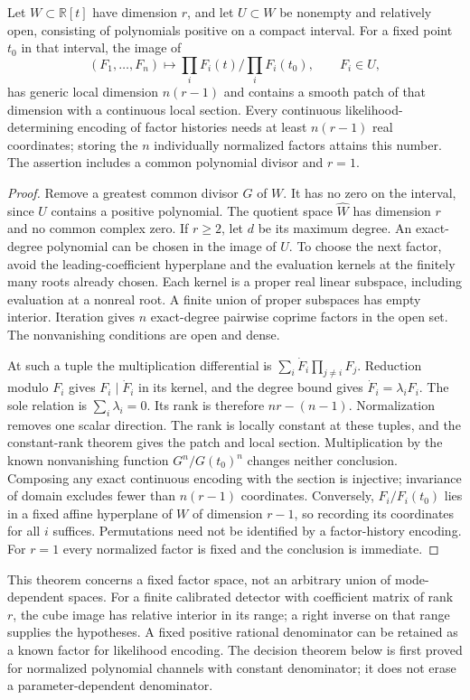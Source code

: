 \begin{theorem}\label{thm:rank-deficient}
Let $W\subset\mathbb R[t]$ have dimension $r$, and let $U\subset W$ be
nonempty and relatively open, consisting of polynomials positive on a
compact interval. For a fixed point $t_0$ in that interval, the image of
\[
 (F_1,\ldots,F_n)\longmapsto
 \prod_iF_i(t)/\prod_iF_i(t_0),\qquad F_i\in U,
\]
has generic local dimension $n(r-1)$ and contains a smooth patch of that
dimension with a continuous local section. Every continuous likelihood-determining
encoding of factor histories needs at least $n(r-1)$ real coordinates; storing
the $n$ individually normalized factors attains this number. The assertion
includes a common polynomial divisor and $r=1$.
\end{theorem}
\begin{proof}
Remove a greatest common divisor $G$ of $W$. It has no zero on the interval,
since $U$ contains a positive polynomial. The quotient space $\widehat W$
has dimension $r$ and no common complex zero. If $r\ge2$, let $d$ be its
maximum degree. An exact-degree polynomial can be chosen in the image of
$U$. To choose the next factor, avoid the leading-coefficient hyperplane
and the evaluation kernels at the finitely many roots already chosen.
Each kernel is a proper real linear subspace, including evaluation at a
nonreal root. A finite union of proper subspaces has empty interior.
Iteration gives $n$ exact-degree pairwise coprime factors in the open set.
The nonvanishing conditions are open and dense.

At such a tuple the multiplication differential is
$\sum_i\dot F_i\prod_{j\ne i}F_j$. Reduction modulo $F_i$ gives
$F_i\mid\dot F_i$ in its kernel, and the degree bound gives
$\dot F_i=\lambda_i F_i$. The sole relation is $\sum_i\lambda_i=0$.
Its rank is therefore $nr-(n-1)$. Normalization removes one scalar
direction. The rank is locally constant at these tuples, and the
constant-rank theorem gives the patch and local section. Multiplication by
the known nonvanishing function $G^n/G(t_0)^n$ changes neither conclusion.
Composing any exact continuous encoding with the section is injective;
invariance of domain excludes fewer than $n(r-1)$ coordinates. Conversely,
$F_i/F_i(t_0)$ lies in a fixed affine hyperplane of $W$ of dimension $r-1$,
so recording its coordinates for all $i$ suffices. Permutations need not be
identified by a factor-history encoding. For $r=1$ every normalized factor
is fixed and the conclusion is immediate.
\end{proof}

This theorem concerns a fixed factor space, not an arbitrary union of
mode-dependent spaces. For a finite calibrated detector with coefficient
matrix of rank $r$, the cube image has relative interior in its range;
a right inverse on that range supplies the hypotheses. A fixed positive
rational denominator can be retained as a known factor for likelihood
encoding. The decision theorem below is first proved for normalized
polynomial channels with constant denominator; it does not erase a
parameter-dependent denominator.

